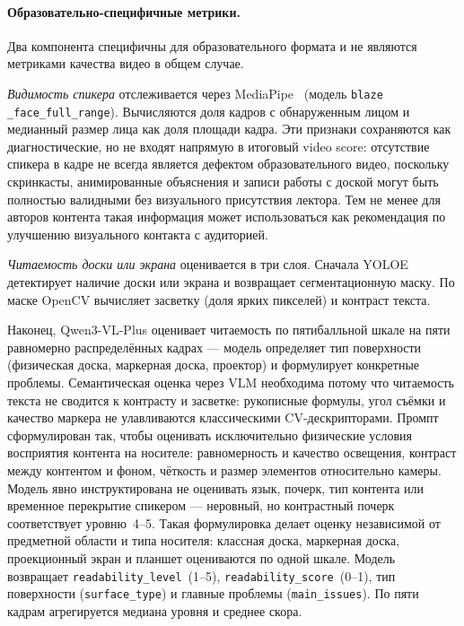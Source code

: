 \paragraph{Образовательно-специфичные метрики.}

Два компонента специфичны для образовательного формата и не являются
метриками качества видео в общем случае.

\textit{Видимость спикера} отслеживается через MediaPipe~\cite{lugaresi2019mediapipe}
(модель \texttt{blaze\\\_face\_full\_range}). Вычисляются доля кадров с обнаруженным
лицом и медианный размер лица как доля площади кадра.
Эти признаки сохраняются как диагностические, но не входят напрямую в итоговый video score:
отсутствие спикера в кадре не всегда является дефектом образовательного видео,
поскольку скринкасты, анимированные объяснения и записи работы с доской могут быть
полностью валидными без визуального присутствия лектора.
Тем не менее для авторов контента такая информация может использоваться как рекомендация
по улучшению визуального контакта с аудиторией.

\textit{Читаемость доски или экрана} оценивается в три слоя.
Сначала YOLOE \cite{wang2025yoloe} детектирует наличие доски или экрана
и возвращает сегментационную маску.
По маске OpenCV вычисляет засветку (доля ярких пикселей) и контраст текста.

Наконец, Qwen3-VL-Plus оценивает читаемость по пятибалльной шкале
на пяти равномерно распределённых кадрах — модель определяет тип поверхности
(физическая доска, маркерная доска, проектор) и формулирует конкретные проблемы.
Семантическая оценка через VLM необходима потому что читаемость текста
не сводится к контрасту и засветке: рукописные формулы, угол съёмки
и качество маркера не улавливаются классическими CV-дескрипторами.
Промпт сформулирован так, чтобы оценивать исключительно
физические условия восприятия контента на носителе:
равномерность и качество освещения, контраст между контентом и фоном,
чёткость и размер элементов относительно камеры.
Модель явно инструктирована не оценивать язык, почерк, тип контента
или временное перекрытие спикером — неровный, но контрастный почерк
соответствует уровню~4–5.
Такая формулировка делает оценку независимой от предметной области
и типа носителя: классная доска, маркерная доска, проекционный экран
и планшет оцениваются по одной шкале.
Модель возвращает \texttt{readability\_level}~(1–5),
\texttt{readability\_score}~(0–1), тип поверхности (\texttt{surface\_type})
и главные проблемы (\texttt{main\_issues}).
По пяти кадрам агрегируется медиана уровня и среднее скора.

